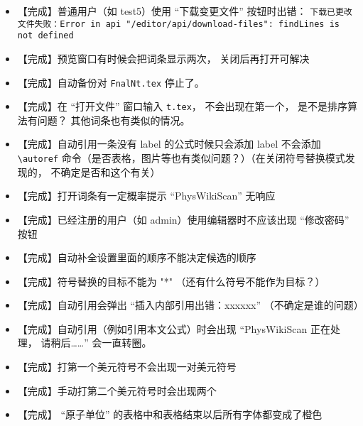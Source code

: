 \begin{itemize}
\item 【完成】普通用户（如 test5）使用 “下载变更文件” 按钮时出错： \verb|下载已更改文件失败：Error in api "/editor/api/download-files": findLines is not defined|

\item 【完成】预览窗口有时候会把词条显示两次， 关闭后再打开可解决

\item 【完成】自动备份对 \verb|FnalNt.tex| 停止了。

\item 【完成】在 “打开文件” 窗口输入 \lstinline|t.tex|， 不会出现在第一个， 是不是排序算法有问题？ 其他词条也有类似的情况。

\item 【完成】自动引用一条没有 label 的公式时候只会添加 label 不会添加 \lstinline|\autoref| 命令（是否表格，图片等也有类似问题？）（在关闭符号替换模式发现的， 不确定是否和这个有关）

\item 【完成】打开词条有一定概率提示 “PhysWikiScan” 无响应

\item 【完成】已经注册的用户（如 admin）使用编辑器时不应该出现 “修改密码” 按钮

\item 【完成】自动补全设置里面的顺序不能决定候选的顺序

\item 【完成】符号替换的目标不能为 "*" （还有什么符号不能作为目标？）

\item 【完成】自动引用会弹出 “插入内部引用出错：xxxxxx” （不确定是谁的问题）

\item 【完成】自动引用（例如引用本文公式）时会出现 “PhysWikiScan 正在处理， 请稍后……” 会一直转圈。

\item 【完成】打第一个美元符号不会出现一对美元符号

\item 【完成】手动打第二个美元符号时会出现两个

\item 【完成】 “原子单位” 的表格中和表格结束以后所有字体都变成了橙色
\end{itemize}

